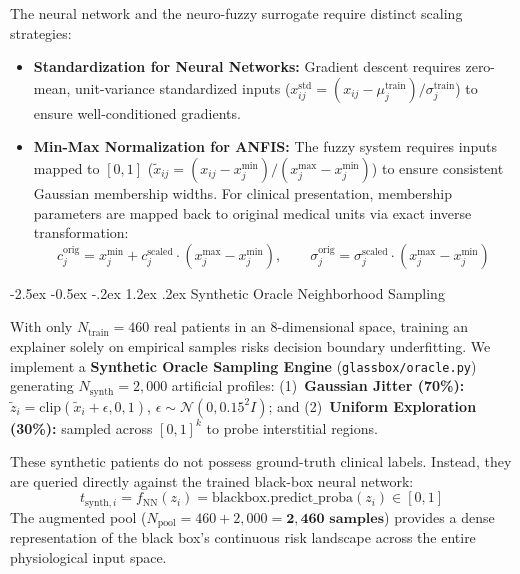 \documentclass[12pt,a4paper,oneside]{report}
\makeatletter
\renewcommand\section{\@startsection {section}{1}{\z@}%
                                   {-2.5ex \@plus -0.5ex \@minus -.2ex}%
                                   {1.2ex \@plus .2ex}%
                                   {\normalfont\fontsize{13}{16}\selectfont\bfseries}}
\makeatother
\begin{document}
The neural network and the neuro-fuzzy surrogate require distinct scaling strategies:
\begin{itemize}
    \setlength{\itemsep}{0pt}
    \setlength{\parskip}{0pt}
    \item \textbf{Standardization for Neural Networks:} Gradient descent requires zero-mean, unit-variance standardized inputs ($x_{ij}^{\text{std}} = (x_{ij} - \mu_j^{\text{train}}) / \sigma_j^{\text{train}}$) to ensure well-conditioned gradients.
    \item \textbf{Min-Max Normalization for ANFIS:} The fuzzy system requires inputs mapped to $[0, 1]$ ($\tilde{x}_{ij} = (x_{ij} - x_j^{\min}) / (x_j^{\max} - x_j^{\min})$) to ensure consistent Gaussian membership widths. For clinical presentation, membership parameters are mapped back to original medical units via exact inverse transformation:
    \begin{equation}
        c_j^{\text{orig}} = x_j^{\min} + c_j^{\text{scaled}} \cdot (x_j^{\max} - x_j^{\min}), \qquad \sigma_j^{\text{orig}} = \sigma_j^{\text{scaled}} \cdot (x_j^{\max} - x_j^{\min})
    \end{equation}
\end{itemize}

\section{Synthetic Oracle Neighborhood Sampling}

With only $N_{\text{train}} = 460$ real patients in an 8-dimensional space, training an explainer solely on empirical samples risks decision boundary underfitting. We implement a \textbf{Synthetic Oracle Sampling Engine} (\texttt{glassbox/oracle.py}) generating $N_{\text{synth}} = 2{,}000$ artificial profiles: (1)~\textbf{Gaussian Jitter (70\%):} $\tilde{z}_i = \text{clip}(\tilde{x}_i + \epsilon, 0, 1)$, $\epsilon \sim \mathcal{N}(0, 0.15^2 I)$; and (2)~\textbf{Uniform Exploration (30\%):} sampled across $[0, 1]^k$ to probe interstitial regions.

These synthetic patients do not possess ground-truth clinical labels. Instead, they are queried directly against the trained black-box neural network:
\begin{equation}
    t_{\text{synth}, i} = f_{\text{NN}}(z_i) = \text{blackbox.predict\_proba}(z_i) \in [0, 1]
\end{equation}
The augmented pool ($N_{\text{pool}} = 460 + 2{,}000 = \mathbf{2{,}460\text{ samples}}$) provides a dense representation of the black box's continuous risk landscape across the entire physiological input space.
\end{document}
